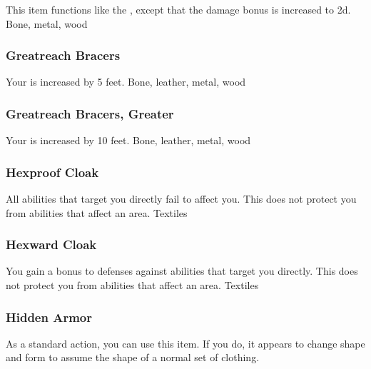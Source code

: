 This item functions like the , except that the damage bonus is increased to \plus2d.
 
 Bone, metal, wood
\lowercase{\hypertarget{item:Greatreach Bracers}{}}\label{item:Greatreach Bracers}
\hypertarget{item:Greatreach Bracers}{\subsubsection{Greatreach Bracers\hfill{}}}
Your  is increased by 5 feet.
 
 Bone, leather, metal, wood
\lowercase{\hypertarget{item:Greatreach Bracers, Greater}{}}\label{item:Greatreach Bracers, Greater}
\hypertarget{item:Greatreach Bracers, Greater}{\subsubsection{Greatreach Bracers, Greater\hfill{}}}
Your  is increased by 10 feet.
 
 Bone, leather, metal, wood
\lowercase{\hypertarget{item:Hexproof Cloak}{}}\label{item:Hexproof Cloak}
\hypertarget{item:Hexproof Cloak}{\subsubsection{Hexproof Cloak\hfill{}}}
All  abilities that target you directly fail to affect you.
This does not protect you from abilities that affect an area.
 
 Textiles
\lowercase{\hypertarget{item:Hexward Cloak}{}}\label{item:Hexward Cloak}
\hypertarget{item:Hexward Cloak}{\subsubsection{Hexward Cloak\hfill{}}}
You gain a  bonus to defenses against  abilities that target you directly.
This does not protect you from abilities that affect an area.
 
 Textiles
\lowercase{\hypertarget{item:Hidden Armor}{}}\label{item:Hidden Armor}
\hypertarget{item:Hidden Armor}{\subsubsection{Hidden Armor\hfill{}}}
As a standard action, you can use this item.
If you do, it appears to change shape and form to assume the shape of a normal set of clothing.
